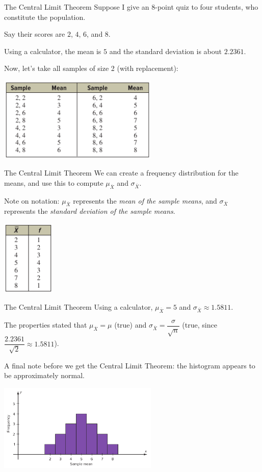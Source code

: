 \documentclass[t, aspectratio=169]{beamer}
\newcommand{\?}{\stackrel{?}{=}}
\begin{document}
	\begin{frame}{The Central Limit Theorem}
		Suppose I give an 8-point quiz to four students, who constitute the population. \pause
		
		Say their scores are $2$, $4$, $6$, and $8$. \pause
		
		Using a calculator, the mean is $5$ and the standard deviation is about $2.2361$. \pause
		
		Now, let's take all samples of size 2 (with replacement): \pause
		
		\includegraphics[width=3in]{clt-dist.png}
	\end{frame}

	\begin{frame}{The Central Limit Theorem}
		We can create a frequency distribution for the means, and use this to compute $\mu_{\overline{X}}$ and $\sigma_{\overline{X}}$. \pause
		
		Note on notation: $\mu_{\overline{X}}$ represents the \textit{mean of the sample means}, and $\sigma_{\overline{X}}$ represents the \textit{standard deviation of the sample means}.
		
		\includegraphics[width=1in]{clt-freq-dist.png}
	\end{frame}

	\begin{frame}{The Central Limit Theorem}
		Using a calculator, $\mu_{\overline{X}} = 5$ and $\sigma_{\overline{X}} \approx 1.5811$. \pause
		
		The properties stated that $\mu_{\overline{X}} = \mu$ (true) and $\sigma_{\overline{X}} = \dfrac{\sigma}{\sqrt{n}}$ (true, since $\dfrac{2.2361}{\sqrt{2}} \approx 1.5811$). \pause
		
		A final note before we get the Central Limit Theorem: the histogram appears to be approximately normal.
		
		\includegraphics[width=3in]{clt-hist.png}
	\end{frame}
\end{document}
